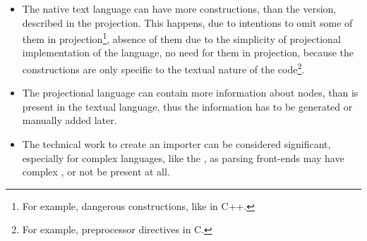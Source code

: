 \begin{itemize}
 \item The native text language can have more 
constructions, than the version, described in the projection. This happens, due to intentions to omit some of them
in projection\footnote{For example, dangerous constructions, like  in C++.}, absence of them due to the simplicity of projectional 
implementation of the language, no need for them in projection, because the constructions are only specific to the textual nature of 
the code\footnote{For example, preprocessor directives in C.}. 

 \item The projectional language can contain more information about  nodes,
than is present in the textual language, thus the information has to be generated or manually added later.

  \item The technical work to create an importer can be considered significant, especially for complex languages, like the \cpppl, as parsing
  front-ends may have complex , or not be present at all.

\end{itemize}
